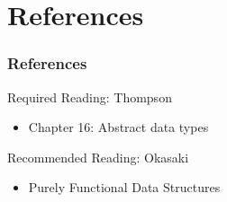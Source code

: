 \documentclass[dvipsnames]{beamer}
\theoremstyle{plain}
\begin{document}
\section*{References}

\begin{frame}
  \frametitle{References}

  \begin{block}{Required Reading: Thompson}
    \begin{itemize}
      \item Chapter 16: \alert{Abstract data types}
    \end{itemize}
  \end{block}

  \begin{block}{Recommended Reading: Okasaki}
    \begin{itemize}
      \item Purely Functional Data Structures
    \end{itemize}
  \end{block}
\end{frame}
\end{document}
